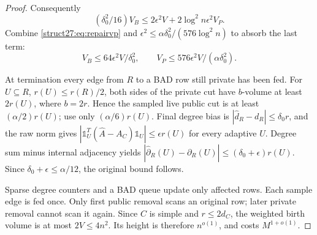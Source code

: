 \documentclass[11pt]{article}
\theoremstyle{remark}
\newcommand{\oone}{\mathds{1}}
\begin{document}
\begin{proof}
Consequently
\[
 (\delta_0^2/16)V_B\le2\epsilon^2V+2\log^2 n\epsilon^2V_P.
\]
Combine \eqref{struct27:eq:repairvp} and
$\epsilon^2\le\alpha\delta_0^2/(576\log^2 n)$ to absorb the last term:
\begin{equation}\label{struct27:eq:repairloss}
 V_B\le64\epsilon^2V/\delta_0^2,\qquad
 V_P\le576\epsilon^2V/(\alpha\delta_0^2).
\end{equation}

At termination every edge from $R$ to a BAD row still private has been fed.
For $U\subseteq R$, $r(U)\le r(R)/2$, both sides of the private cut have
$b$-volume at least $2r(U)$, where $b=2r$.
Hence the sampled live public cut is at least $(\alpha/2)r(U)$; use only
$(\alpha/6)r(U)$.
Final degree bias is $|\widehat d_R-d_R|\le\delta_0r$, and the raw norm gives
$|\oone_U^T(\widehat A-A_C)\oone_U|\le\epsilon r(U)$ for every adaptive $U$.
Degree sum minus internal adjacency yields
$|\widehat\partial_R(U)-\partial_R(U)|\le(\delta_0+\epsilon)r(U)$.
Since $\delta_0+\epsilon\le\alpha/12$, the original bound follows.

Sparse degree counters and a BAD queue update only affected rows.
Each sample edge is fed once.
Only first public removal scans an original row; later private removal cannot
scan it again.
Since $C$ is simple and $r\le2d_C$, the weighted birth volume is at most
$2V\le4n^2$.
Its height is therefore $n^{o(1)}$, and  costs
$M^{1+o(1)}$.
\end{proof}
\end{document}
